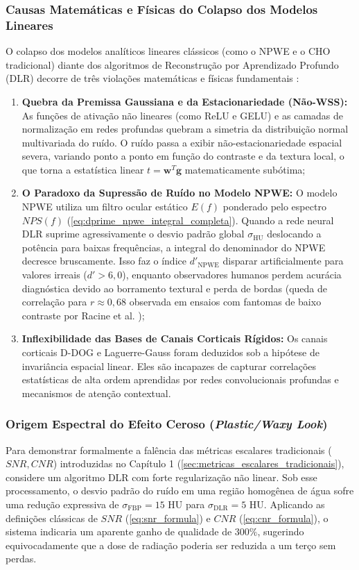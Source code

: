 \documentclass[
  12pt,
  a4paper,
  oneside
]{report}
\begin{document}
\subsubsection{Causas Matemáticas e Físicas do Colapso dos Modelos Lineares}
O colapso dos modelos analíticos lineares clássicos (como o NPWE e o CHO tradicional) diante dos algoritmos de Reconstrução por Aprendizado Profundo (DLR) decorre de três violações matemáticas e físicas fundamentais \cite{racine2021, toia2023, debbiche2024}:
\begin{enumerate}
  \item \textbf{Quebra da Premissa Gaussiana e da Estacionariedade (Não-WSS):} As funções de ativação não lineares (como ReLU e GELU) e as camadas de normalização em redes profundas quebram a simetria da distribuição normal multivariada do ruído. O ruído passa a exibir não-estacionariedade espacial severa, variando ponto a ponto em função do contraste e da textura local, o que torna a estatística linear $t = \mathbf{w}^T \mathbf{g}$ matematicamente subótima;
  \item \textbf{O Paradoxo da Supressão de Ruído no Modelo NPWE:} O modelo NPWE utiliza um filtro ocular estático $E(f)$ ponderado pelo espectro $NPS(f)$ (\cref{eq:dprime_npwe_integral_completa}). Quando a rede neural DLR suprime agressivamente o desvio padrão global $\sigma_{\text{HU}}$ deslocando a potência para baixas frequências, a integral do denominador do NPWE decresce bruscamente. Isso faz o índice $d'_{\text{NPWE}}$ disparar artificialmente para valores irreais ($d' > 6{,}0$), enquanto observadores humanos perdem acurácia diagnóstica devido ao borramento textural e perda de bordas (queda de correlação para $r \approx 0{,}68$ observada em ensaios com fantomas de baixo contraste por Racine et al. \cite{racine2021});
  \item \textbf{Inflexibilidade das Bases de Canais Corticais Rígidos:} Os canais corticais D-DOG e Laguerre-Gauss foram deduzidos sob a hipótese de invariância espacial linear. Eles são incapazes de capturar correlações estatísticas de alta ordem aprendidas por redes convolucionais profundas e mecanismos de atenção contextual.
\end{enumerate}

\subsubsection{Origem Espectral do Efeito Ceroso (\emph{Plastic/Waxy Look})}
Para demonstrar formalmente a falência das métricas escalares tradicionais ($SNR, CNR$) introduzidas no Capítulo 1 (\cref{sec:metricas_escalares_tradicionais}), considere um algoritmo DLR com forte regularização não linear. Sob esse processamento, o desvio padrão do ruído em uma região homogênea de água sofre uma redução expressiva de $\sigma_{\text{FBP}} = 15\text{ HU}$ para $\sigma_{\text{DLR}} = 5\text{ HU}$. Aplicando as definições clássicas de $SNR$ (\cref{eq:snr_formula}) e $CNR$ (\cref{eq:cnr_formula}), o sistema indicaria um aparente ganho de qualidade de $300\%$, sugerindo equivocadamente que a dose de radiação poderia ser reduzida a um terço sem perdas.
\end{document}
